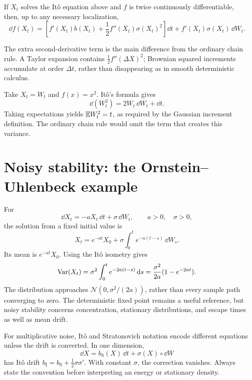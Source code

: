 \begin{theorem}
If \(X_t\) solves the It\^o equation above and \(f\) is twice continuously differentiable, then, up to any necessary localization,
\[
\dd f(X_t)
=\left[f'(X_t)b(X_t)
+\frac12f''(X_t)\sigma(X_t)^2\right]\dd t
+f'(X_t)\sigma(X_t)\,\dd W_t.
\]
\end{theorem}
The extra second-derivative term is the main difference from the ordinary chain rule. A Taylor expansion contains \(\frac12f''(\Delta X)^2\); Brownian squared increments accumulate at order \(\Delta t\), rather than disappearing as in smooth deterministic calculus.

\begin{example}
Take \(X_t=W_t\) and \(f(x)=x^2\). It\^o's formula gives
\[
\dd(W_t^2)=2W_t\,\dd W_t+\dd t.
\]
Taking expectations yields \(\mathbb{E} W_t^2=t\), as required by the Gaussian increment definition. The ordinary chain rule would omit the term that creates this variance.
\end{example}

\section{Noisy stability: the Ornstein--Uhlenbeck example}
For
\[
\dd X_t=-aX_t\,\dd t+\sigma\,\dd W_t,\qquad a>0,\quad\sigma>0,
\]
the solution from a fixed initial value is
\[
X_t=e^{-at}X_0+\sigma\int_0^t e^{-a(t-s)}\,\dd W_s.
\]
Its mean is \(e^{-at}X_0\). Using the It\^o isometry gives
\[
\operatorname{Var}(X_t)
=\sigma^2\int_0^t e^{-2a(t-s)}\,\mathrm{d} s
=\frac{\sigma^2}{2a}(1-e^{-2at}).
\]
The distribution approaches \(\mathcal N(0,\sigma^2/(2a))\), rather than every sample path converging to zero. The deterministic fixed point remains a useful reference, but noisy stability concerns concentration, stationary distributions, and escape times as well as mean drift.

For multiplicative noise, It\^o and Stratonovich notation encode different equations unless the drift is converted. In one dimension,
\[
\dd X=b_{\mathrm S}(X)\,\dd t+\sigma(X)\circ\dd W
\]
has It\^o drift \(b_{\mathrm I}=b_{\mathrm S}+\frac12\sigma\sigma'\). With constant \(\sigma\), the correction vanishes. Always state the convention before interpreting an energy or stationary density.

